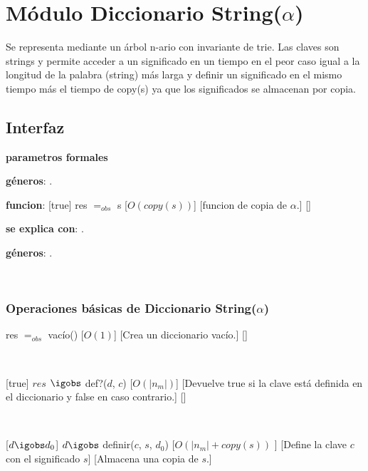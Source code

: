 \section{Módulo Diccionario String($\alpha$)}

Se representa mediante un árbol n-ario con invariante de trie. Las claves son strings y permite acceder a un significado en un tiempo en el peor caso igual a la longitud de la palabra (string) más larga y definir un significado en el mismo tiempo más el tiempo 
de copy(s) ya que los significados se almacenan por copia.

\subsection{Interfaz}

\textbf{parametros formales}

\textbf{géneros}: \TipoVariable{$\alpha$}.

\textbf{funcion}: 
				  [true]
				  {res $=_{obs}$ s}
				  [$O(copy(s))$]
				  [funcion de copia de $\alpha$.]
				  []

\textbf{se explica con}: .

\textbf{géneros}: .



~

\subsubsection{Operaciones básicas de Diccionario String($\alpha$)}

{res $=_{obs}$ vacío()}
[$O(1)$]
[Crea un diccionario vacío.]
[]

~



[true]
{$res$ $\igobs$ def?($d$, $c$)}
[$O(|n_m|)$]
[Devuelve true si la clave está definida en el diccionario y false en caso contrario.]
[]

~

[$ d \igobs d_0 $]
{$ d \igobs$ definir($c$, $s$, $d_0$)}
[$O(|n_m| + copy(s))$ ]
[Define la clave $c$ con el significado $s$]
[Almacena una copia de $s$.]

